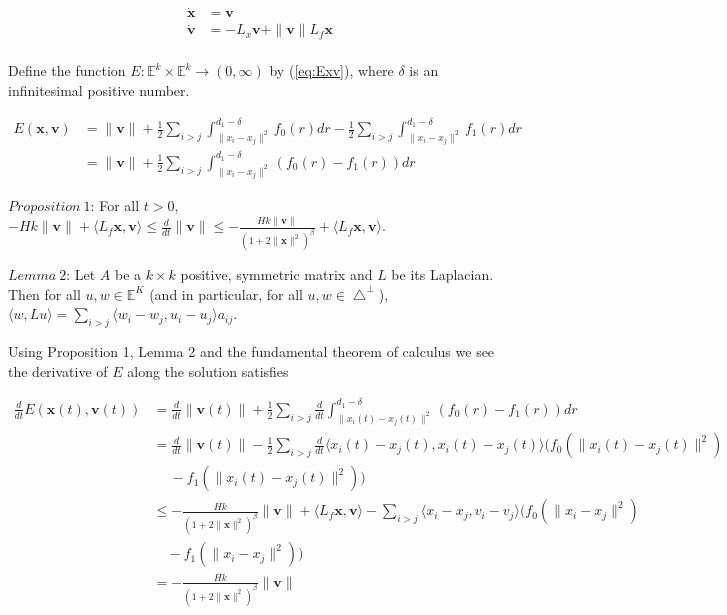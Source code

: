 \begin{equation}\label{eq:continuous_projection}
\begin{aligned}
\mathbf{\dot{x}}&=\mathbf{v}\\
\mathbf{\dot{v}}&=-L_x\mathbf{v}+\|\mathbf{v}\|L_f\mathbf{x}\\
\end{aligned}
\end{equation}

Define the function $E: \mathbb{E}^k\times\mathbb{E}^k\to(0,\infty)$ by (\ref{eq:Exv}), where $\delta$ is an infinitesimal positive number.

\begin{equation}\label{eq:Exv}
\begin{aligned}
E(\mathbf{x}, \mathbf{v})&=\|\mathbf{v}\|+\frac{1}{2}\sum_{i>j}\int_{\|x_i-x_j\|^2}^{d_1-\delta}f_0(r)dr-\frac{1}{2}\sum_{i>j}\int_{\|x_i-x_j\|^2}^{d_1-\delta}f_1(r)dr\\
&=\|\mathbf{v}\|+\frac{1}{2}\sum_{i>j}\int_{\|x_i-x_j\|^2}^{d_1-\delta}(f_0(r)-f_1(r))dr
\end{aligned}
\end{equation}

$\mathit{Proposition\ 1}$: For all $t>0$, $-Hk\|\mathbf{v}\|+\langle L_f\mathbf{x}, \mathbf{v}\rangle\leq\frac{d}{dt}\|\mathbf{v}\|\leq-\frac{Hk\|\mathbf{v}\|}{(1+2\|\mathbf{x}\|^2)^{\beta}}+\langle L_f\mathbf{x}, \mathbf{v}\rangle$.

$\mathit{Lemma\ 2}$: Let $A$ be a $k\times k$ positive, symmetric matrix and $L$ be its Laplacian. Then for all $u, w\in\mathbb{E}^K$ (and in particular, for all $u, w\in\bigtriangleup^{\perp}$), $\langle w, Lu\rangle=\sum_{i>j}\langle w_i-w_j, u_i-u_j\rangle a_{ij}$.

\noindent
Using Proposition 1, Lemma 2 and the fundamental theorem of calculus we see the derivative of $E$ along the solution satisfies

\begin{equation}\label{eq:dExv}
\begin{aligned}
\frac{d}{dt}E(\mathbf{x}(t), \mathbf{v}(t))&=\frac{d}{dt}\|\mathbf{v}(t)\|+\frac{1}{2}\sum_{i>j}\frac{d}{dt}\int_{\|x_i(t)-x_j(t)\|^2}^{d_1-\delta}(f_0(r)-f_1(r))dr\\
&=\frac{d}{dt}\|\mathbf{v}(t)\|-\frac{1}{2}\sum_{i>j}\frac{d}{dt}\langle x_i(t)-x_j(t),x_i(t)-x_j(t)\rangle(f_0(\|x_i(t)-x_j(t)\|^2)\\
&\quad\ -f_1(\|x_i(t)-x_j(t)\|^2))\\
&\leq-\frac{Hk}{(1+2\|\mathbf{x}\|^2)^{\beta}}\|\mathbf{v}\|+\langle L_f\mathbf{x}, \mathbf{v}\rangle-\sum_{i>j}\langle x_i-x_j, v_i-v_j\rangle(f_0(\|x_i-x_j\|^2)\\
&\quad-f_1(\|x_i-x_j\|^2))\\
&=-\frac{Hk}{(1+2\|\mathbf{x}\|^2)^{\beta}}\|\mathbf{v}\|
\end{aligned}
\end{equation}

